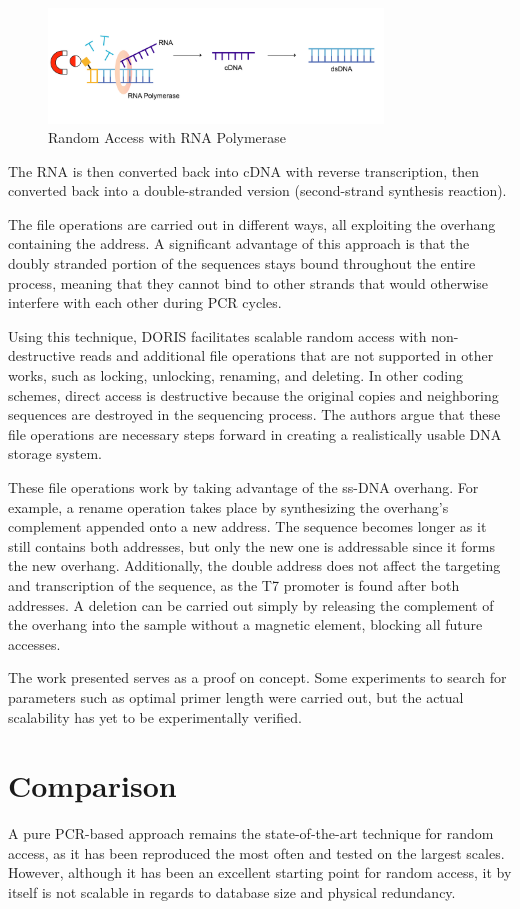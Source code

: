 \documentclass[a4paper,conference]{IEEEtran}
\begin{document}
\begin{figure}[!t]
\centering
\includegraphics[width=3.5in]{images/t7}
\caption{Random Access with RNA Polymerase}
\label{t7}
\end{figure}
The RNA is then converted back into cDNA with reverse transcription, then converted back into a double-stranded version (second-strand synthesis reaction).

The file operations are carried out in different ways, all exploiting the overhang containing the address. A significant advantage of this approach is that the doubly stranded portion of the sequences stays bound throughout the entire process, meaning that they cannot bind to other strands that would otherwise interfere with each other during PCR cycles.

Using this technique, DORIS facilitates scalable random access with non-destructive reads and additional file operations that are not supported in other works, such as locking, unlocking, renaming, and deleting. In other coding schemes, direct access is destructive because the original copies and neighboring sequences are destroyed in the sequencing process. The authors argue that these file operations are necessary steps forward in creating a realistically usable DNA storage system.

These file operations work by taking advantage of the ss-DNA overhang. For example, a rename operation takes place by synthesizing the overhang's complement appended onto a new address. The sequence becomes longer as it still contains both addresses, but only the new one is addressable since it forms the new overhang. Additionally, the double address does not affect the targeting and transcription of the sequence, as the T7 promoter is found after both addresses. A deletion can be carried out simply by releasing the complement of the overhang into the sample without a magnetic element, blocking all future accesses.

The work presented serves as a proof on concept. Some experiments to search for parameters such as optimal primer length were carried out, but the actual scalability has yet to be experimentally verified.

\section{Comparison}
A pure PCR-based approach remains the state-of-the-art technique for random access, as it has been reproduced the most often and tested on the largest scales. However, although it has been an excellent starting point for random access, it by itself is not scalable in regards to database size and physical redundancy. 
\end{document}
